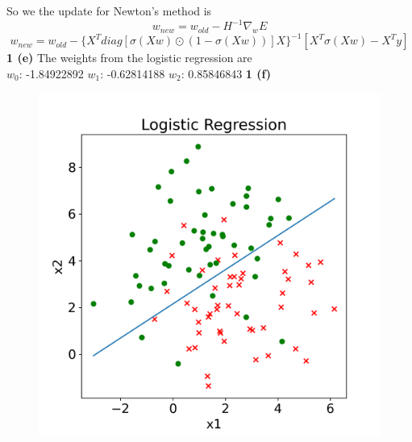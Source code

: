 \documentclass[12 pt]{article}        	%
\begin{document}
So we the update for Newton's method is
\[
  w_{new} = w_{old} - H^{-1} \nabla_w E 
\]
\[
  w_{new} = w_{old} - \{X^T diag[ \sigma(Xw) \odot (1 - \sigma(Xw)) ] X \}^{-1} [ X^T \sigma(Xw) - X^T y ]
\]
\textbf{1 (e)} The weights from the logistic regression are \\ 
$ w_0 $: -1.84922892 $ w_1 $: -0.62814188 $ w_2 $: 0.85846843
\newpage
\textbf{1 (f)}
\begin{figure}[h!]
  \includegraphics[width=\linewidth]{logistic_regression.png}
\end{figure}
\end{document}
